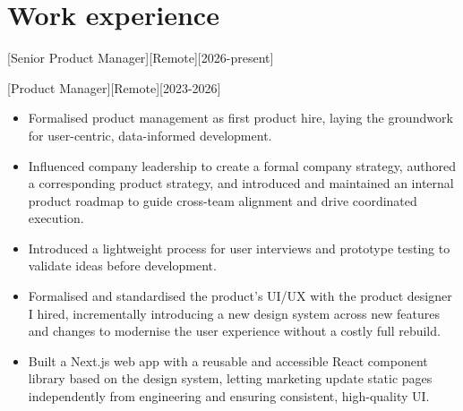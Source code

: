 \documentclass[10pt]{article}
\begin{document}
\makecvtitle

\section{Work experience}
\label{sec:work}

[Senior Product Manager][Remote][2026-present]

[Product Manager][Remote][2023-2026]
\begin{itemize}
    \item Formalised product management as first product hire, laying the groundwork for user-centric, data-informed development.
    \item Influenced company leadership to create a formal company strategy, authored a corresponding product strategy, and introduced and maintained an internal product roadmap to guide cross-team alignment and drive coordinated execution.
    \item Introduced a lightweight process for user interviews and prototype testing to validate ideas before development.
    \item Formalised and standardised the product's UI/UX with the product designer I hired, incrementally introducing a new design system across new features and changes to modernise the user experience without a costly full rebuild.
    \item Built a Next.js web app with a reusable and accessible React component library based on the design system, letting marketing update static pages independently from engineering and ensuring consistent, high-quality UI.
\end{itemize}
\end{document}
